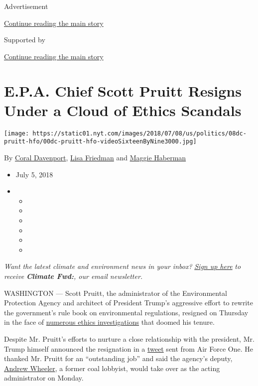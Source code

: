 Advertisement

\protect\hyperlink{after-top}{Continue reading the main story}

Supported by

\protect\hyperlink{after-sponsor}{Continue reading the main story}

\hypertarget{epa-chief-scott-pruitt-resigns-under-a-cloud-of-ethics-scandals}{%
\section{E.P.A. Chief Scott Pruitt Resigns Under a Cloud of Ethics
Scandals}\label{epa-chief-scott-pruitt-resigns-under-a-cloud-of-ethics-scandals}}

\texttt{[image: https://static01.nyt.com/images/2018/07/08/us/politics/08dc-pruitt-hfo/00dc-pruitt-hfo-videoSixteenByNine3000.jpg]}

By \href{https://www.nytimes.com/by/coral-davenport}{Coral Davenport},
\href{https://www.nytimes.com/by/lisa-friedman}{Lisa Friedman} and
\href{https://www.nytimes.com/by/maggie-haberman}{Maggie Haberman}

\begin{itemize}
\item
  July 5, 2018
\item
  \begin{itemize}
  \item
  \item
  \item
  \item
  \item
  \item
  \end{itemize}
\end{itemize}

\emph{Want the latest climate and environment news in your inbox?}
\href{https://www.nytimes.com/newsletters/climate-change}{\emph{Sign up
here}} \emph{to receive} \emph{\textbf{Climate Fwd:}}\emph{, our email
newsletter.}

WASHINGTON --- Scott Pruitt, the administrator of the Environmental
Protection Agency and architect of President Trump's aggressive effort
to rewrite the government's rule book on environmental regulations,
resigned on Thursday in the face of
\href{https://www.nytimes.com/2018/04/18/climate/scott-pruitt-epa-investigations-guide.html}{numerous
ethics investigations} that doomed his tenure.

Despite Mr. Pruitt's efforts to nurture a close relationship with the
president, Mr. Trump himself announced the resignation in a
\href{https://twitter.com/realDonaldTrump/status/1014956568129892352}{tweet}
sent from Air Force One. He thanked Mr. Pruitt for an ``outstanding
job'' and said the agency's deputy,
\href{https://www.nytimes.com/2018/07/05/climate/wheeler-epa-pruitt.html}{Andrew
Wheeler}, a former coal lobbyist, would take over as the acting
administrator on Monday.

